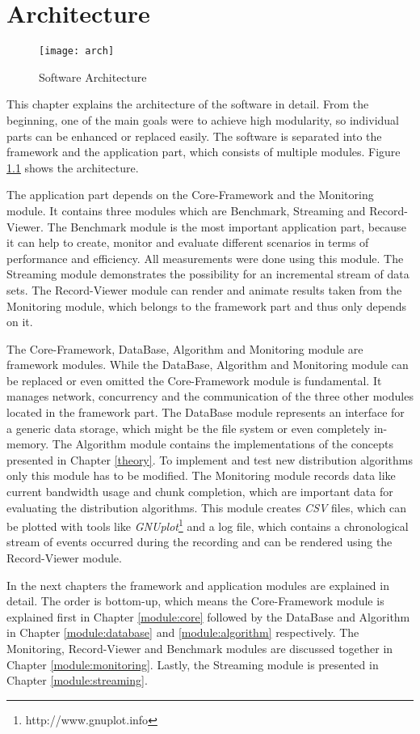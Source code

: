 
\chapter{Architecture}
\label{architecture}

\begin{figure}[ht]
	\centering
	\texttt{[image: arch]}
	\caption{Software Architecture}
	\label{fig:arch}
\end{figure}

This chapter explains the architecture of the software in detail. From the beginning, one of the main goals were to achieve high modularity, so individual parts can be enhanced or replaced easily. The software is separated into the framework and the application part, which consists of multiple modules. Figure \ref{fig:arch} shows the architecture. 

\vfill
\pagebreak

The application part depends on the Core-Framework and the Monitoring module. It contains three modules which are Benchmark, Streaming and Record-Viewer. The Benchmark module is the most important application part, because it can help to create, monitor and evaluate different scenarios in terms of performance and efficiency. All measurements were done using this module. The Streaming module demonstrates the possibility for an incremental stream of data sets. The Record-Viewer module can render and animate results taken from the Monitoring module, which belongs to the framework part and thus only depends on it.

The Core-Framework, DataBase, Algorithm and Monitoring module are framework modules. While the DataBase, Algorithm and Monitoring module can be replaced or even omitted the Core-Framework module is fundamental. It manages network, concurrency and the communication of the three other modules located in the framework part. The DataBase module represents an interface for a generic data storage, which might be the file system or even completely in-memory. The Algorithm module contains the implementations of the concepts presented in Chapter \ref{theory}. To implement and test new distribution algorithms only this module has to be modified. The Monitoring module records data like current bandwidth usage and chunk completion, which are important data for evaluating the distribution algorithms. This module creates \emph{CSV} files, which can be plotted with tools like \emph{GNUplot}\footnote{http://www.gnuplot.info} and a log file, which contains a chronological stream of events occurred during the recording and can be rendered using the Record-Viewer module.

In the next chapters the framework and application modules are explained in detail. The order is bottom-up, which means the Core-Framework module is explained first in Chapter \ref{module:core} followed by the DataBase and Algorithm in Chapter \ref{module:database} and \ref{module:algorithm} respectively. The Monitoring, Record-Viewer and Benchmark modules are discussed together in Chapter \ref{module:monitoring}. Lastly, the Streaming module is presented in Chapter \ref{module:streaming}.